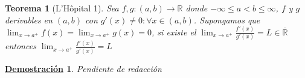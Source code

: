 \documentclass[10pt,a4paper,openright]{book}
\theoremstyle{break}
\newtheorem{theo}{Teorema}[chapter]
\newtheorem*{demo}{\underline{Demostración}}
\begin{document}
\begin{theo}[L'Hôpital 1]
Sea $f,g: (a,b) \rightarrow \mathbb R$ donde $-\infty \leq a < b \leq \infty$, $f$ y $g$ derivables en $(a,b)$ con $g'(x)\neq 0: \forall x\in (a,b)$. Supongamos que $\lim_{x\rightarrow a^+} f(x)=\lim_{x\rightarrow a^+} g(x)=0$, si existe el $\lim_{x\rightarrow a^+} \frac{f'(x)}{g'(x)}=L\in \overline{\mathbb R}$ entonces $\lim_{x\rightarrow a^+}\frac{f'(x)}{g'(x)}=L$
\end{theo}
\begin{demo}
	Pendiente de redacción











\end{demo}
\end{document}
